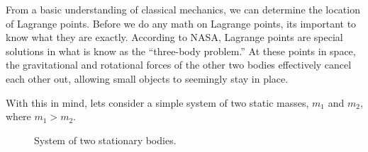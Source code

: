 From a basic understanding of classical mechanics, we can determine the location of Lagrange points. Before we do any math on Lagrange points, its important to know what they are exactly. According to NASA, Lagrange points are special solutions in what is know as the ``three-body problem.'' At these points in space, the gravitational and rotational forces of the other two bodies effectively cancel each other out, allowing small objects to seemingly stay in place\autocite{JWSTOrbit}.

With this in mind, lets consider a simple system of two static masses, $m_1$ and $m_2$, where $m_1 > m_2$.

\vspace*{0.5cm}
\begin{figure}[!h]
	\centering
	\vspace*{0.25cm}
	\caption{System of two stationary bodies.}
	\label{fig:collinear-coords}
\end{figure}

